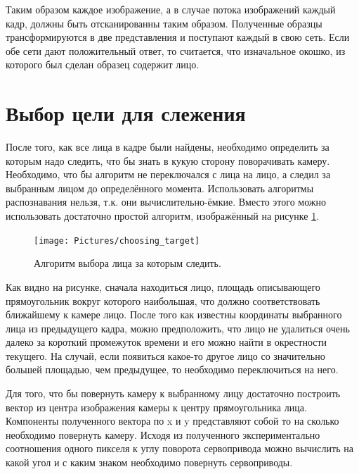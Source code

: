 \documentclass[12pt]{report}
\begin{document}
Таким образом каждое изображение, а в случае потока изображений каждый кадр, должны быть отсканированны таким 
образом. 
Полученные образцы трансформируются в две представления и поступают каждый в свою сеть. Если обе сети дают 
положительный ответ, то считается, что изначальное окошко, из которого был сделан образец содержит лицо.

\section{Выбор цели для слежения}
После того, как все лица в кадре были найдены, необходимо определить за которым надо следить, что бы знать в кукую 
сторону поворачивать камеру. Необходимо, что бы алгоритм не переключался с лица на лицо, а следил за выбранным 
лицом 
до определённого момента. Использовать алгоритмы распознавания нельзя, т.к. они вычислительно-ёмкие. Вместо этого 
можно использовать достаточно простой алгоритм, изображённый на рисунке \ref{fig:choosing_face}.

\begin{figure}[h]
	\centering
	\texttt{[image: Pictures/choosing\_target]}	
	\caption{Алгоритм выбора лица за которым следить.}
	\label{fig:choosing_face}
\end{figure}

Как видно на рисунке, сначала находиться лицо, площадь описывающего прямоугольник вокруг которого наибольшая, что 
должно соответствовать ближайшему к камере лицо. После того как известны координаты выбранного лица из предыдущего 
кадра, можно предположить, что лицо не удалиться очень далеко за короткий промежуток времени и его можно найти в 
окрестности текущего. На случай, если появиться какое-то другое лицо со значительно большей площадью, чем 
предыдущее, 
то необходимо переключиться на него. 

Для того, что бы повернуть камеру к выбранному лицу достаточно построить вектор из центра изображения камеры к 
центру  
прямоугольника лица. Компоненты полученного вектора по x и y представляют собой то на сколько необходимо повернуть 
камеру. Исходя из полученного экспериментально соотношения одного пикселя к углу поворота сервопривода можно 
вычислить на какой угол и с каким знаком необходимо повернуть сервоприводы.

\end{document}
